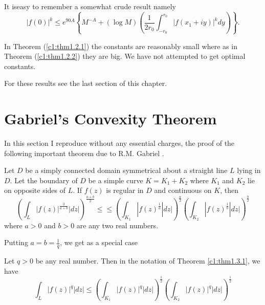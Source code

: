 \setcounter{remark}{0}
\begin{remark}\label{c1:rem1a}
It is\pageoriginale easy to remember a somewhat crude result namely
\begin{equation*}
|f(0)|^k \leq e^{90 A} \left\{ M^{-A} + (\log M) \left(\frac{1}{2r_0} \int^{r_0}_{-r_0} |f(x_1+iy)|^k dy\right)\right\}.  \tag{1.2.11}\label{c1:eq1.2.11}
\end{equation*}
\end{remark}

\begin{remark}\label{c1:rem2a}
In Theorem (\ref{c1:thm1.2.1}) the constants are reasonably small where as in Theorem (\ref{c1:thm1.2.2}) they are big. We have not attempted to get optimal constants.
\end{remark}

For these results see the last section of this chapter.

\section{Gabriel's Convexity Theorem}\label{c1:sec1.3}

In this section I reproduce without any essential charges, the proof of the following important theorem due to R.M. Gabriel \cite{Gabriel1}.

\begin{theorem}\label{c1:thm1.3.1}
Let $D$ be a simply connected domain symmetrical about a straight line $L$ lying in $D$. Let the boundary of $D$ be a simple curve $K = K_1 + K_2$ where $K_1$ and $K_2$ lie on opposite sides of $L$. If $f(z)$ is regular in $D$ and continuous on $K$, then
$$
\left( \int_L |f(z)|^{\frac{2}{a+b}} |dz|\right)^{\frac{a+b}{2}} \leq \leq \left( \int_{K_1} |f(z)^{\frac{1}{a}}| dz| \right)^{\frac{a}{2}} \left( \int_{K_2} |f(z)^{\frac{1}{b}}|dz|\right)^{\frac{b}{2}}
$$
where $a>0$ and $b>0$ are any two real numbers.
\end{theorem}

Putting $a = b= \frac{1}{q}$, we get as a special case

\begin{theorem}\label{c1:thm1.3.2}
Let $q > 0$ be any real number. Then in the notation of Theorem \ref{c1:thm1.3.1}, we have
$$
\int_L |f(z)|^q|dz| \leq \left( \int_{K_1} |f(z)|^q|dz|\right)^{\frac{1}{2}} \left( \int_{K_2} |f(z)|^q |dz| \right)^{\frac{1}{2}}
$$
\end{theorem}



